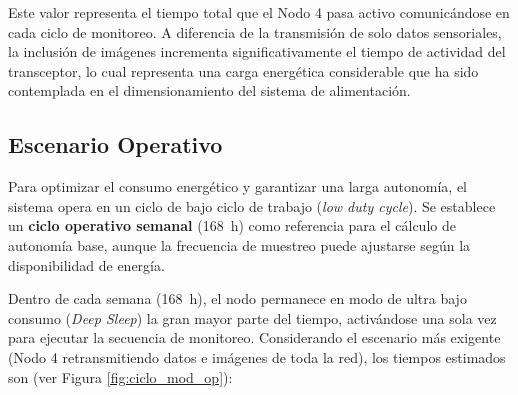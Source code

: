 Este valor representa el tiempo total que el Nodo 4 pasa activo comunicándose en cada ciclo de monitoreo. A diferencia de la transmisión de solo datos sensoriales, la inclusión de imágenes incrementa significativamente el tiempo de actividad del transceptor, lo cual representa una carga energética considerable que ha sido contemplada en el dimensionamiento del sistema de alimentación.

\subsection{Escenario Operativo}
\label{subsec:escenario_operativo}

Para optimizar el consumo energético y garantizar una larga autonomía, el sistema opera en un ciclo de bajo ciclo de trabajo (\textit{low duty cycle}). Se establece un \textbf{ciclo operativo semanal} (\SI{168}{\hour}) como referencia para el cálculo de autonomía base, aunque la frecuencia de muestreo puede ajustarse según la disponibilidad de energía.

Dentro de cada semana (\SI{168}{\hour}), el nodo permanece en modo de ultra bajo consumo (\textit{Deep Sleep}) la gran mayor parte del tiempo, activándose una sola vez para ejecutar la secuencia de monitoreo. Considerando el escenario más exigente (Nodo 4 retransmitiendo datos e imágenes de toda la red), los tiempos estimados son (ver Figura \ref{fig:ciclo_mod_op}):

